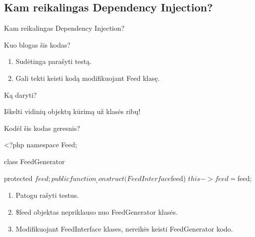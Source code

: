 \documentclass[12pt,a4paper]{beamer}
\begin{document}
\subsection{Kam reikalingas Dependency Injection?}
\begin{frame}[fragile]

    {\Huge Kam reikalingas Dependency Injection?}
\end{frame}

\begin{frame}[fragile]{Kuo blogas šis kodas?}
\pause
\begin{enumerate}
    \item Sudėtinga parašyti testą.
    \item Gali tekti keisti kodą modifikuojant Feed klasę.
\end{enumerate}
\end{frame}

\begin{frame}[fragile]{Ką daryti?}
    \begin{center}
        {\Huge Iškelti vidinių objektų kūrimą už klasės ribų!}
    \end{center}
\end{frame}

\begin{frame}[fragile]{Kodėl šis kodas geresnis?}
\begin{phpcode}
    <?php
    namespace Feed;

    class FeedGenerator {

        protected $feed;

        public function __construct(FeedInterface $feed) {
            $this->feed = $feed;
        }
    }
\end{phpcode}
\begin{enumerate}
    \item Patogu rašyti testus.
    \item \$feed objektas nepriklauso nuo FeedGenerator klasės.
    \item Modifikuojant FeedInterface klases, nereikės keisti FeedGenerator kodo.
\end{enumerate}
\end{frame}
\end{document}
